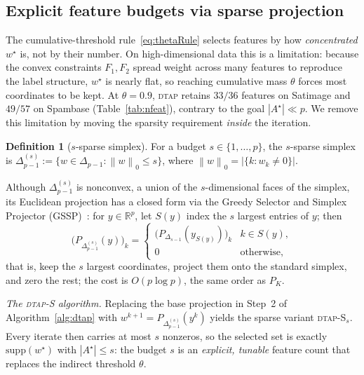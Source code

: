 \documentclass[]{interact}
\theoremstyle{plain}
\theoremstyle{definition}
\newtheorem{definition}[theorem]{Definition}
\theoremstyle{remark}
\newcommand{\R}{\mathbb{R}}
\newcommand{\norm}[1]{\left\lVert #1 \right\rVert}
\newcommand{\abs}[1]{\left\lvert #1 \right\rvert}
\newcommand{\dtap}{\textsc{dtap}}
\begin{document}
\subsection{Explicit feature budgets via sparse projection}\label{ssec:dtaps}
The cumulative-threshold rule~\eqref{eq:thetaRule} selects features by how \emph{concentrated} $w^\star$ is, not by their number. On high-dimensional data this is a limitation: because the convex constraints $F_1,F_2$ spread weight across many features to reproduce the label structure, $w^\star$ is nearly flat, so reaching cumulative mass $\theta$ forces most coordinates to be kept. At $\theta=0.9$, \dtap{} retains $33/36$ features on Satimage and $49/57$ on Spambase (Table~\ref{tab:nfeat}), contrary to the goal $|A^\star|\ll p$. We remove this limitation by moving the sparsity requirement \emph{inside} the iteration.

\begin{definition}[$s$-sparse simplex]\label{def:sparse-simplex}
For a budget $s\in\{1,\dots,p\}$, the $s$-sparse simplex is $\Delta_{p-1}^{(s)}:=\{w\in\Delta_{p-1}:\norm{w}_0\le s\}$, where $\norm{w}_0=\abs{\{k:w_k\ne0\}}$.
\end{definition}

Although $\Delta_{p-1}^{(s)}$ is nonconvex, a union of the $s$-dimensional faces of the simplex, its Euclidean projection has a closed form via the Greedy Selector and Simplex Projector (GSSP)~\citep{kyrillidis2013}: for $y\in\R^p$, let $S(y)$ index the $s$ largest entries of $y$; then
\begin{equation}\label{eq:gssp}
\bigl(P_{\Delta_{p-1}^{(s)}}(y)\bigr)_k=
\begin{cases}\bigl(P_{\Delta_{s-1}}(y_{S(y)})\bigr)_k & k\in S(y),\\[2pt] 0 & \text{otherwise,}\end{cases}
\end{equation}
that is, keep the $s$ largest coordinates, project them onto the standard simplex, and zero the rest; the cost is $O(p\log p)$, the same order as $P_K$.

\noindent\emph{The \dtap-S algorithm.} Replacing the base projection in Step~2 of Algorithm~\ref{alg:dtap} with $w^{k+1}=P_{\Delta_{p-1}^{(s)}}(y^k)$ yields the sparse variant \dtap-S$_s$. Every iterate then carries at most $s$ nonzeros, so the selected set is exactly $\mathrm{supp}(w^\star)$ with $|A^\star|\le s$: the budget $s$ is an \emph{explicit, tunable} feature count that replaces the indirect threshold $\theta$.
\end{document}
